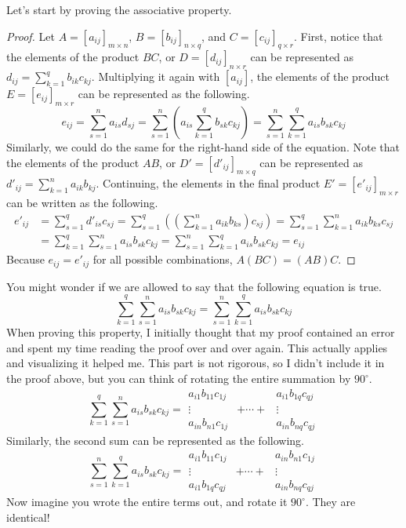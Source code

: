 \documentclass[../main.tex]{subfiles}
\begin{document}
Let's start by proving the associative property.
\begin{proof}
Let $A = [a_{ij}]_{m \times n}$, $B = [b_{ij}]_{n \times q}$,
and $C = [c_{ij}]_{q \times r}$. First, notice that the elements
of the product $BC$, or $D = [d_{ij}]_{n \times r}$ can be
represented as $d_{ij} = \sum_{k=1}^{q} b_{ik} c_{kj}$. Multiplying
it again with $[a_{ij}]$, the elements of the product
$E = [e_{ij}]_{m \times r}$ can be represented as the following.
\[
e_{ij}
= \sum_{s=1}^{n} a_{is} d_{sj}
= \sum_{s=1}^{n} \left(
    a_{is} \sum_{k=1}^{q} b_{sk} c_{kj}
\right)
= \sum_{s=1}^{n} \sum_{k=1}^{q} a_{is} b_{sk} c_{kj}
\]
Similarly, we could do the same for the right-hand side of the
equation. Note that the elements of the product $AB$, or
$D' = [d'_{ij}]_{m \times q}$ can be represented as
$d'_{ij} = \sum_{k=1}^{n} a_{ik} b_{kj}$. Continuing, the elements
in the final product $E' = [e'_{ij}]_{m \times r}$ can be written as
the following.
\begin{align*}
    e'_{ij}
    &= \sum_{s=1}^{q} d'_{is} c_{sj}
    = \sum_{s=1}^{q} \left(
        \left(\sum_{k=1}^{n} a_{ik} b_{ks} \right) c_{sj}
    \right)
    = \sum_{s=1}^{q} \sum_{k=1}^{n} a_{ik} b_{ks} c_{sj} \\
    &= \sum_{k=1}^{q} \sum_{s=1}^{n} a_{is} b_{sk} c_{kj}
    = \sum_{s=1}^{n} \sum_{k=1}^{q} a_{is} b_{sk} c_{kj}
    = e_{ij}
\end{align*}
Because $e_{ij} = e'_{ij}$ for all possible combinations,
$A(BC) = (AB)C$.
\end{proof}
\begin{thoughts}
You might wonder if we are allowed to say that the following equation
is true.
\[
\sum_{k=1}^{q} \sum_{s=1}^{n} a_{is} b_{sk} c_{kj}
= \sum_{s=1}^{n} \sum_{k=1}^{q} a_{is} b_{sk} c_{kj}
\]
When proving this property, I initially thought that my proof
contained an error and spent my time reading the proof over and
over again. This actually applies and visualizing it helped me.
This part is not rigorous, so I didn't include it in the proof
above, but you can think of rotating the entire summation by
$90^\circ$.
\[
\sum_{k=1}^{q} \sum_{s=1}^{n} a_{is} b_{sk} c_{kj}
=
\begin{array}{ccc}
    a_{i1}b_{11}c_{1j} & & a_{i1}b_{1q}c_{qj} \\
    \vdots & + \cdots + & \vdots \\
    a_{in}b_{n1}c_{1j} & & a_{in}b_{nq}c_{qj}
\end{array}
\]
Similarly, the second sum can be represented as the following.
\[
\sum_{s=1}^{n} \sum_{k=1}^{q} a_{is} b_{sk} c_{kj}
=
\begin{array}{ccc}
    a_{i1}b_{11}c_{1j} & & a_{in}b_{n1}c_{1j} \\
    \vdots & + \cdots + & \vdots \\
    a_{i1}b_{1q}c_{qj} & & a_{in}b_{nq}c_{qj}
\end{array}
\]
Now imagine you wrote the entire terms out, and rotate it
$90^\circ$. They are identical!
\end{thoughts}
\end{document}
